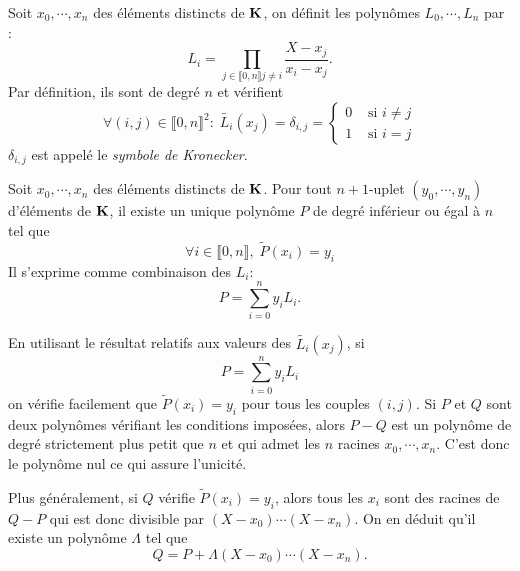 Soit $x_0,\cdots,x_n$ des éléments distincts de $\mathbf{K}$, on définit les polynômes $L_0,\cdots, L_n$ par :
\begin{displaymath}
 L_i = \prod_{j\in\llbracket 0 , n \rrbracket j\neq i}\frac{X-x_j}{x_i - x_j}.
\end{displaymath}
Par définition, ils sont de degré $n$ et vérifient
\begin{displaymath}
 \forall (i,j) \in \llbracket 0, n \rrbracket^2:\; \widetilde{L_i}(x_j) = \delta_{i,j}
=
\left\lbrace 
\begin{aligned}
 0 &\text{ si } i\neq j \\ 1 &\text{ si } i = j 
\end{aligned}
\right. 
\end{displaymath}
 $\delta_{i,j}$ est appelé le \emph{symbole de Kronecker}.
\begin{prop}
Soit $x_0,\cdots,x_n$ des éléments distincts de $\mathbf{K}$. Pour tout $n+1$-uplet $(y_0,\cdots,y_n)$ d'éléments de $\mathbf{K}$, il existe un unique polynôme $P$ de degré inférieur ou égal à $n$ tel que 
\begin{displaymath}
 \forall i \in \llbracket 0 , n\rrbracket,\; \widetilde{P}(x_i) = y_i
\end{displaymath}
Il s'exprime comme combinaison des $L_i$:
\begin{displaymath}
 P = \sum_{i=0}^n y_i L_i .
\end{displaymath} 
\end{prop}
\begin{demo}
 En utilisant le résultat relatifs aux valeurs des $\widetilde{L_i}(x_j)$, si 
\begin{displaymath}
 P = \sum_{i=0}^n y_i L_i
\end{displaymath}
on vérifie facilement que $\widetilde{P}(x_i) = y_i$ pour tous les couples $(i,j)$.\newline
Si $P$ et $Q$ sont deux polynômes vérifiant les conditions imposées, alors $P-Q$ est un polynôme de degré strictement plus petit que $n$ et qui admet les $n$ racines $x_0,\cdots,x_n$. C'est donc le polynôme nul ce qui assure l'unicité.
\end{demo}
\begin{rem}
 Plus généralement, si $Q$ vérifie $\widetilde{P}(x_i) = y_i$, alors tous les $x_i$ sont des racines de $Q-P$ qui est donc divisible par $(X-x_0)\cdots(X-x_n)$. On en déduit qu'il existe un polynôme $\Lambda$ tel que 
\begin{displaymath}
 Q = P + \Lambda (X-x_0)\cdots(X-x_n).
\end{displaymath}
\end{rem}


